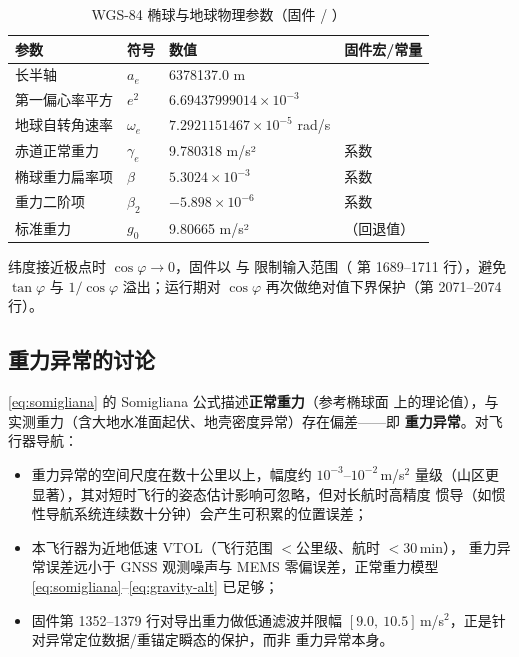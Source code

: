 \begin{table}[H]
\centering
\caption{WGS-84 椭球与地球物理参数（固件  / ）}
\label{tab:wgs84}
\small
\begin{tabularx}{\textwidth}{@{}L{5.4cm}C{3.4cm}C{3.4cm}X@{}}
\toprule
\textbf{参数} & \textbf{符号} & \textbf{数值} & \textbf{固件宏/常量} \\
\midrule
长半轴 & $a_e$ & 6378137.0 m &  \\
第一偏心率平方 & $e^2$ & $6.69437999014\times10^{-3}$ &  \\
地球自转角速率 & $\omega_e$ & $7.2921151467\times10^{-5}$ rad/s &  \\
赤道正常重力 & $\gamma_e$ & 9.780318 m/s² &  系数 \\
椭球重力扁率项 & $\beta$ & $5.3024\times10^{-3}$ &  系数 \\
重力二阶项 & $\beta_2$ & $-5.898\times10^{-6}$ &  系数 \\
标准重力 & $g_0$ & 9.80665 m/s² & （回退值）\\
\bottomrule
\end{tabularx}
\end{table}

\begin{remark}
纬度接近极点时 $\cos\varphi \to 0$，固件以  与
 限制输入范围（ 第
1689--1711 行），避免 $\tan\varphi$ 与 $1/\cos\varphi$ 溢出；运行期对
$\cos\varphi$ 再次做绝对值下界保护（第 2071--2074 行）。
\end{remark}

\subsection{重力异常的讨论}

\cref{eq:somigliana} 的 Somigliana 公式描述\textbf{正常重力}（参考椭球面
上的理论值），与实测重力（含大地水准面起伏、地壳密度异常）存在偏差——即
\textbf{重力异常}。对飞行器导航：
\begin{itemize}
  \item 重力异常的空间尺度在数十公里以上，幅度约 $10^{-3}$--$10^{-2}$\,m/s$^2$
    量级（山区更显著），其对短时飞行的姿态估计影响可忽略，但对长航时高精度
    惯导（如惯性导航系统连续数十分钟）会产生可积累的位置误差；
  \item 本飞行器为近地低速 VTOL（飞行范围 $<$公里级、航时 $<$30\,min），
    重力异常误差远小于 GNSS 观测噪声与 MEMS 零偏误差，正常重力模型
    \cref{eq:somigliana}--\cref{eq:gravity-alt} 已足够；
  \item 固件第 1352--1379 行对导出重力做低通滤波并限幅
    $[9.0,\ 10.5]$\,m/s$^2$，正是针对异常定位数据/重锚定瞬态的保护，而非
    重力异常本身。
\end{itemize}

